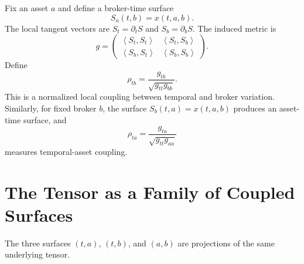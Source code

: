 \documentclass[11pt,a4paper]{article}
\numberwithin{equation}{section}
\newcommand{\inner}[2]{\left\langle#1,#2\right\rangle}
\begin{document}
Fix an asset $a$ and define a broker-time surface
\begin{equation}
S_a(t,b)=x(t,a,b).
\label{eq:broker_surface}
\end{equation}
The local tangent vectors are $S_t=\partial_tS$ and
$S_b=\partial_bS$. The induced metric is
\begin{equation}
g=
\begin{pmatrix}
\inner{S_t}{S_t}&\inner{S_t}{S_b}\\
\inner{S_b}{S_t}&\inner{S_b}{S_b}
\end{pmatrix}.
\label{eq:metric}
\end{equation}
Define
\begin{equation}
\rho_{tb}=\frac{g_{tb}}{\sqrt{g_{tt}g_{bb}}}.
\label{eq:rho_tb}
\end{equation}
This is a normalized local coupling between temporal and broker
variation. Similarly, for fixed broker $b$, the surface
$S_b(t,a)=x(t,a,b)$ produces an asset-time surface, and
\begin{equation}
\rho_{ta}=\frac{g_{ta}}{\sqrt{g_{tt}g_{aa}}}
\label{eq:rho_ta}
\end{equation}
measures temporal-asset coupling.

\section{The Tensor as a Family of Coupled Surfaces}

The three surfaces $(t,a)$, $(t,b)$, and $(a,b)$ are projections of
the same underlying tensor.

\begin{center}
\end{center}
\end{document}

